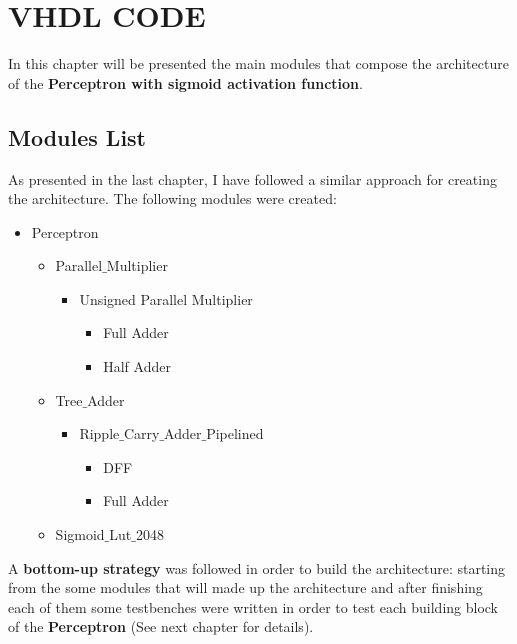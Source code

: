 \section{VHDL CODE}
In this chapter will be presented the main modules that compose the architecture of the \textbf{Perceptron with sigmoid activation function}.
\subsection{Modules List}
As presented in the last chapter, I have followed a similar approach for creating the architecture. The following modules were created:

\begin{itemize}
	\item Perceptron
	\begin{itemize}
		\item Parallel$\_$Multiplier
  		\begin{itemize}
  			\item Unsigned Parallel Multiplier
  			\begin{itemize}
	  			\item Full Adder
	  			\item Half Adder
  			\end{itemize}
		\end{itemize}
	\end{itemize}
	\begin{itemize}
		\item Tree$\_$Adder
		\begin{itemize}
			\item Ripple$\_$Carry$\_$Adder$\_$Pipelined
			\begin{itemize}
				\item DFF
				\item Full Adder
			\end{itemize} 
		\end{itemize} 
	\end{itemize}
	\begin{itemize}
		\item Sigmoid$\_$Lut$\_$2048
	\end{itemize}
\end{itemize}

A \textbf{bottom-up strategy} was followed in order to build the architecture: starting from the some modules that will made up the architecture and after finishing each of them some testbenches were written in order to test each building block of the \textbf{Perceptron} (See next chapter for details).
